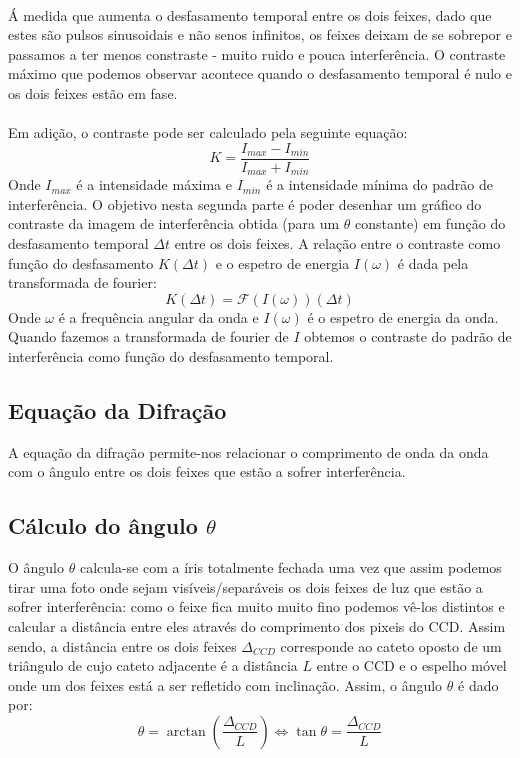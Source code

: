 \documentclass{article}
\begin{document}
\begin{multicols}{2}
\paragraph{}
Á medida que aumenta o desfasamento temporal entre os dois feixes, dado que estes são pulsos sinusoidais e não senos infinitos, os feixes deixam de se sobrepor e passamos a ter menos constraste - muito ruido e pouca interferência.
O contraste máximo que podemos observar acontece quando o desfasamento temporal é nulo e os dois feixes estão em fase.
\paragraph{}
Em adição, o contraste pode ser calculado pela seguinte equação:
\[ K = \frac{I_{max} - I_{min}}{I_{max} + I_{min}} \]
Onde $I_{max}$ é a intensidade máxima e $I_{min}$ é a intensidade mínima do padrão de interferência.
O objetivo nesta segunda parte é poder desenhar um gráfico do contraste da imagem de interferência obtida (para um $\theta$ constante) em função do desfasamento temporal $\Delta t$ entre os dois feixes.
A relação entre o contraste como função do desfasamento $K(\Delta t)$ e o espetro de energia $I(\omega)$ é dada pela transformada de fourier:
\[ K(\Delta t) = \mathcal{F}(I(\omega))(\Delta t) \]
Onde $\omega$ é a frequência angular da onda e $I(\omega)$ é o espetro de energia da onda.
Quando fazemos a transformada de fourier de $I$ obtemos o contraste do padrão de interferência como função do desfasamento temporal.

\subsection{Equação da Difração}

A equação da difração permite-nos relacionar o comprimento de onda da onda com o ângulo entre os dois feixes que estão a sofrer interferência. 

\subsection{Cálculo do ângulo $\theta$}

O ângulo $\theta$ calcula-se com a íris totalmente fechada uma vez que assim podemos tirar uma foto onde sejam visíveis/separáveis os dois feixes de luz que estão a sofrer interferência: como o feixe fica muito muito fino podemos vê-los distintos e calcular a distância entre eles através do comprimento dos pixeis do CCD. 
Assim sendo, a distância entre os dois feixes $\Delta_{CCD}$ corresponde ao cateto oposto de um triângulo de cujo cateto adjacente é a distância $L$ entre o CCD e o espelho móvel onde um dos feixes está a ser refletido com inclinação. Assim, o ângulo $\theta$ é dado por:
\[ \theta = \arctan \left( \frac{\Delta_{CCD}}{L} \right) \Leftrightarrow \tan \theta = \frac{\Delta_{CCD}}{L} \]


\end{multicols}
\end{document}

